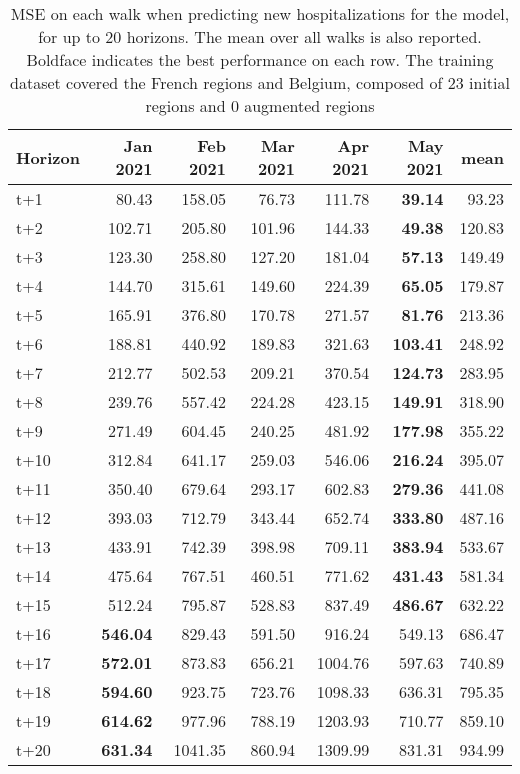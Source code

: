 \begin{table}[H]
\centering
\caption{MSE on each walk when predicting new hospitalizations for the model, for up to 20 horizons. The mean over all walks is also reported. Boldface indicates the best performance on each row. The training dataset covered the French regions and Belgium, composed of 23 initial regions and 0 augmented regions }
\label{tab:MSE_walk_custom_linear_regression}
\begin{tabular}{lrrrrrr}
\toprule
Horizon &  Jan 2021 &  Feb 2021 &  Mar 2021 &  Apr 2021 &  May 2021 &   mean \\
\midrule
t+1  & 80.43  & 158.05  & 76.73  & 111.78  & \textbf{39.14}  & 93.23  \\
t+2  & 102.71  & 205.80  & 101.96  & 144.33  & \textbf{49.38}  & 120.83  \\
t+3  & 123.30  & 258.80  & 127.20  & 181.04  & \textbf{57.13}  & 149.49  \\
t+4  & 144.70  & 315.61  & 149.60  & 224.39  & \textbf{65.05}  & 179.87  \\
t+5  & 165.91  & 376.80  & 170.78  & 271.57  & \textbf{81.76}  & 213.36  \\
t+6  & 188.81  & 440.92  & 189.83  & 321.63  & \textbf{103.41}  & 248.92  \\
t+7  & 212.77  & 502.53  & 209.21  & 370.54  & \textbf{124.73}  & 283.95  \\
t+8  & 239.76  & 557.42  & 224.28  & 423.15  & \textbf{149.91}  & 318.90  \\
t+9  & 271.49  & 604.45  & 240.25  & 481.92  & \textbf{177.98}  & 355.22  \\
t+10  & 312.84  & 641.17  & 259.03  & 546.06  & \textbf{216.24}  & 395.07  \\
t+11  & 350.40  & 679.64  & 293.17  & 602.83  & \textbf{279.36}  & 441.08  \\
t+12  & 393.03  & 712.79  & 343.44  & 652.74  & \textbf{333.80}  & 487.16  \\
t+13  & 433.91  & 742.39  & 398.98  & 709.11  & \textbf{383.94}  & 533.67  \\
t+14  & 475.64  & 767.51  & 460.51  & 771.62  & \textbf{431.43}  & 581.34  \\
t+15  & 512.24  & 795.87  & 528.83  & 837.49  & \textbf{486.67}  & 632.22  \\
t+16  & \textbf{546.04}  & 829.43  & 591.50  & 916.24  & 549.13  & 686.47  \\
t+17  & \textbf{572.01}  & 873.83  & 656.21  & 1004.76  & 597.63  & 740.89  \\
t+18  & \textbf{594.60}  & 923.75  & 723.76  & 1098.33  & 636.31  & 795.35  \\
t+19  & \textbf{614.62}  & 977.96  & 788.19  & 1203.93  & 710.77  & 859.10  \\
t+20  & \textbf{631.34}  & 1041.35  & 860.94  & 1309.99  & 831.31  & 934.99  \\

\bottomrule
\end{tabular}
\end{table}
